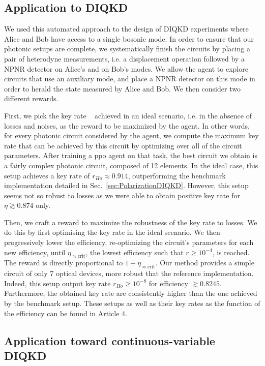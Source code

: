 \subsection{Application to DIQKD}
\label{sec:new_design}

We used this automated approach to the design of DIQKD experiments where Alice and Bob have access to a single bosonic mode. 
In order to ensure that our photonic setups are complete, we systematically finish the circuits by placing a pair of heterodyne measurements, i.e. a displacement operation followed by a NPNR detector on Alice's and on Bob's modes. 
We allow the agent to explore circuits that use an auxiliary mode, and place a NPNR detector on this mode in order to herald the state measured by Alice and Bob. 
We then consider two different rewards.

First, we pick the key rate ~ achieved in an ideal scenario, i.e. in the absence of losses and noises, as the reward to be maximized by the agent. 
In other words, for every photonic circuit considered by the agent, we compute the maximum key rate that can be achieved by this circuit by optimizing over all of the circuit parameters.
After training a \acrshort{ppo} agent on that task, the best circuit we obtain is a fairly complex photonic circuit, composed of 12 elements.
In the ideal case, this setup achieves a key rate of $r_{Ho}\approx 0.914$, outperforming the benchmark implementation detailed in Sec.~\ref{sec:PolarizationDIQKD}.
However, this setup seems not so robust to losses as we were able to obtain positive key rate for $\eta \apprge 0.874$ only.

Then, we craft a reward to maximize the robustness of the key rate to losses.
We do this by first optimising the key rate in the ideal scenario.
We then progressively lower the efficiency, re-optimizing the circuit's parameters for each new efficiency, until $\eta_{\approx\mathrm{crit}}$, the lowest efficiency such that $r \geq 10^{-4}$, is reached.
The reward is directly proportional to $1-\eta_{\approx \mathrm{crit}}$.
Our method provides a simple circuit of only 7 optical devices, more robust that the reference implementation.
Indeed, this setup output key rate $r_{Ho}\geq10^{-8}$ for efficiency $\apprge 0.8245$. 
Furthermore, the obtained key rate are consistently higher than the one achieved by the benchmark setup.
These setups as well as their key rates as the function of the efficiency can be found in Article 4.


\subsection{Application toward continuous-variable DIQKD}
\label{sec:homodyne}

